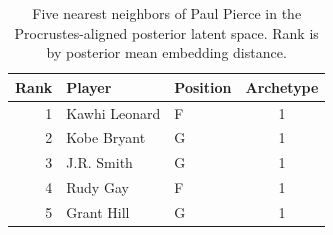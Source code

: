 \begin{table}[htbp]
  \centering\small
  \begin{tabular}{rllc}
    \toprule
    Rank & Player & Position & Archetype \\
    \midrule
    1 & Kawhi Leonard & F & 1 \\
    2 & Kobe Bryant & G & 1 \\
    3 & J.R. Smith & G & 1 \\
    4 & Rudy Gay & F & 1 \\
    5 & Grant Hill & G & 1 \\
    \bottomrule
  \end{tabular}
  \caption{Five nearest neighbors of Paul Pierce in the Procrustes-aligned posterior latent space. Rank is by posterior mean embedding distance.}
  \label{tab:Paul_Pierce_neighbors}
\end{table}

